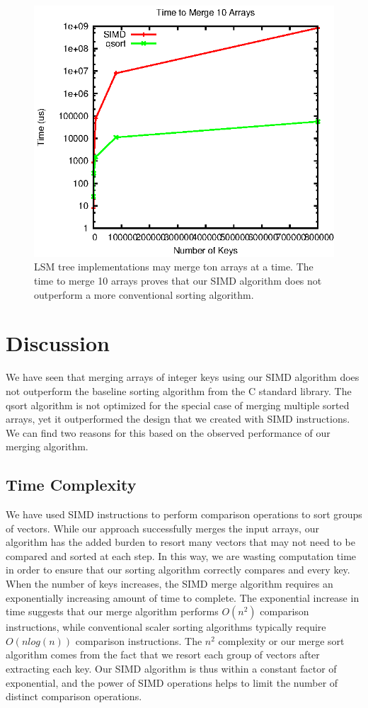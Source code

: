 \documentclass[10pt,twocolumn]{article}
\begin{document}
\begin{figure}
\label{f10}
\includegraphics[width=\linewidth]{10.eps}
\caption{LSM tree implementations may merge ton arrays at a time.  The time to merge 10 arrays proves that our SIMD algorithm does not outperform a more conventional sorting algorithm.}
\end{figure}

\section{Discussion}
We have seen that merging arrays of integer keys using our SIMD algorithm does not outperform the baseline sorting algorithm from the C standard library.  The qsort algorithm is not optimized for the special case of merging multiple sorted arrays, yet it outperformed the design that we created with SIMD instructions.  We can find two reasons for this based on the observed performance of our merging algorithm.

\subsection{Time Complexity}
We have used SIMD instructions to perform comparison operations to sort groups of vectors.  While our approach successfully merges the input arrays, our algorithm has the added burden to resort many vectors that may not need to be compared and sorted at each step.  In this way, we are wasting computation time in order to ensure that our sorting algorithm correctly compares and every key.  When the number of keys increases, the SIMD merge algorithm requires an exponentially increasing amount of time to complete.  The exponential increase in time suggests that our merge algorithm performs $O(n^2)$ comparison instructions, while conventional scaler sorting algorithms typically require $O(n \textit{log}(n))$ comparison instructions.  The $n^2$ complexity or our merge sort algorithm comes from the fact that we resort each group of vectors after extracting each key.  Our SIMD algorithm is thus within a constant factor of exponential, and the power of SIMD operations helps to limit the number of distinct comparison operations.
\end{document}
